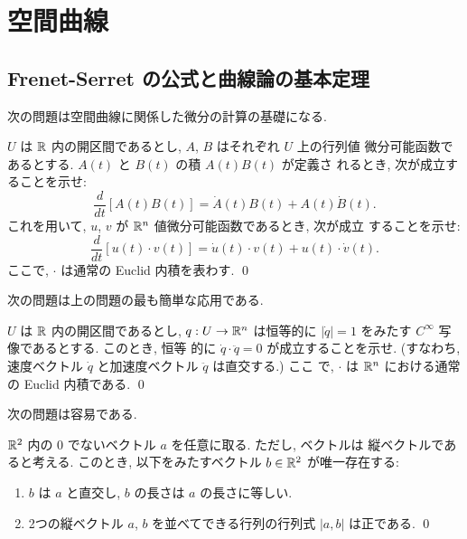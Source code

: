 \documentclass[12pt,twoside]{jarticle}
\begin{document}

\section{空間曲線}


\subsection{Frenet-Serret の公式と曲線論の基本定理}

次の問題は空間曲線に関係した微分の計算の基礎になる.

\begin{question}[微分のLeibnitz則]
  $U$ は ${\mathbb R}$ 内の開区間であるとし, $A$, $B$ はそれぞれ $U$ 上の行列値
  微分可能函数であるとする. $A(t)$ と $B(t)$ の積 $A(t)B(t)$ が定義さ
  れるとき, 次が成立することを示せ:
  \[
    \frac{d}{dt}\left[A(t)B(t)\right]
    = \dot{A}(t) B(t) + A(t) \dot{B}(t).
  \]
  これを用いて, $u$, $v$ が ${\mathbb R}^n$ 値微分可能函数であるとき, 次が成立
  することを示せ:
  \[
    \frac{d}{dt}\left[u(t)\cdot v(t)\right]
    = \dot{u}(t) \cdot v(t) + u(t) \cdot \dot{v}(t).
  \]
  ここで, $\cdot$ は通常の Euclid 内積を表わす. \qed
\end{question}

次の問題は上の問題の最も簡単な応用である.

\begin{question}
  $U$ は ${\mathbb R}$ 内の開区間であるとし, $q : U \to {\mathbb R}^n$ は恒等的に 
  $|\dot{q}| = 1$ をみたす $C^\infty$ 写像であるとする. このとき, 恒等
  的に $\dot{q} \cdot \ddot{q} = 0$ が成立することを示せ. (すなわち, 
  速度ベクトル $\dot{q}$ と加速度ベクトル $\ddot{q}$ は直交する.) ここ
  で, $\cdot$ は ${\mathbb R}^n$ における通常の Euclid 内積である. \qed
\end{question}

次の問題は容易である.

\begin{question}
  ${\mathbb R}^2$ 内の $0$ でないベクトル $a$ を任意に取る. ただし, ベクトルは
  縦ベクトルであると考える. %
  このとき, 以下をみたすベクトル $b \in {\mathbb R}^2$ が唯一存在する:
  \begin{enumerate}
  \item $b$ は $a$ と直交し, $b$ の長さは $a$ の長さに等しい.
  \item 2つの縦ベクトル $a$, $b$ を並べてできる行列の行列式 $|a, b|$ %
    は正である.  \qed
  \end{enumerate}
\end{question}
\end{document}
